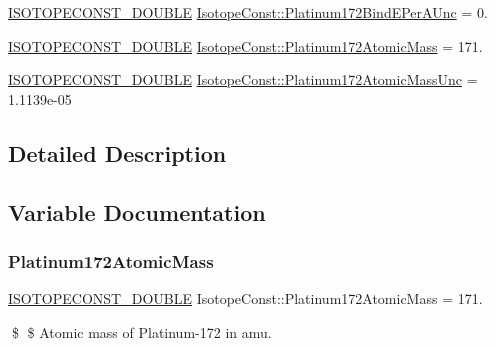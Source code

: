 \begin{DoxyCompactItemize}
\mbox{\hyperlink{group___isotope_const-_macros_ga8f45a7272ce02c0b4c65c44636ed719a}{I\+S\+O\+T\+O\+P\+E\+C\+O\+N\+S\+T\+\_\+\+D\+O\+U\+B\+LE}} \mbox{\hyperlink{group___isotope_const-_platinum-_pt172_ga638e4faba7f3ed1296081eea40ed24b6}{Isotope\+Const\+::\+Platinum172\+Bind\+E\+Per\+A\+Unc}} = 0.
\item 
\mbox{\hyperlink{group___isotope_const-_macros_ga8f45a7272ce02c0b4c65c44636ed719a}{I\+S\+O\+T\+O\+P\+E\+C\+O\+N\+S\+T\+\_\+\+D\+O\+U\+B\+LE}} \mbox{\hyperlink{group___isotope_const-_platinum-_pt172_ga4fd8ec7e155e43dad5be2ee5e4a45ca8}{Isotope\+Const\+::\+Platinum172\+Atomic\+Mass}} = 171.
\item 
\mbox{\hyperlink{group___isotope_const-_macros_ga8f45a7272ce02c0b4c65c44636ed719a}{I\+S\+O\+T\+O\+P\+E\+C\+O\+N\+S\+T\+\_\+\+D\+O\+U\+B\+LE}} \mbox{\hyperlink{group___isotope_const-_platinum-_pt172_ga0c3d3670372cd148d5294e1ff49fa712}{Isotope\+Const\+::\+Platinum172\+Atomic\+Mass\+Unc}} = 1.\+1139e-\/05
\end{DoxyCompactItemize}


\subsection{Detailed Description}


\subsection{Variable Documentation}
\mbox{\label{group___isotope_const-_platinum-_pt172_ga4fd8ec7e155e43dad5be2ee5e4a45ca8}} 
\subsubsection{\texorpdfstring{Platinum172\+Atomic\+Mass}{Platinum172AtomicMass}}
{\footnotesize\ttfamily \mbox{\hyperlink{group___isotope_const-_macros_ga8f45a7272ce02c0b4c65c44636ed719a}{I\+S\+O\+T\+O\+P\+E\+C\+O\+N\+S\+T\+\_\+\+D\+O\+U\+B\+LE}} Isotope\+Const\+::\+Platinum172\+Atomic\+Mass = 171.}

\$ \$ Atomic mass of Platinum-\/172 in amu. \mbox{\label{group___isotope_const-_platinum-_pt172_ga0c3d3670372cd148d5294e1ff49fa712}} 

